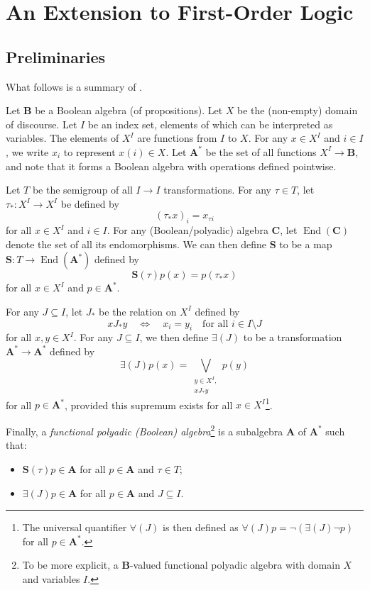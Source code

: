\documentclass{article}
\theoremstyle{definition}
\theoremstyle{remark}
\DeclareMathOperator{\End}{End}
\begin{document}
\section{An Extension to First-Order Logic}

\subsection{Preliminaries}

What follows is a summary of \cite{halmos2016algebraic}.

Let $\mathbf{B}$ be a Boolean algebra (of propositions). Let $X$ be the
(non-empty) domain of discourse. Let $I$ be an index set, elements of which can
be interpreted as variables. The elements of $X^I$ are functions from $I$ to
$X$. For any $x \in X^I$ and $i \in I$, we write $x_i$ to represent $x(i) \in
X$. Let $\mathbf{A^*}$ be the set of all functions $X^I \to \mathbf{B}$, and
note that it forms a Boolean algebra with operations defined pointwise.

Let $T$ be the semigroup of all $I \to I$ transformations. For any $\tau \in
T$, let $\tau_* : X^I \to X^I$ be defined by
\[
  (\tau_* x)_i = x_{\tau i}
\]
for all $x \in X^I$ and $i \in I$. For any (Boolean/polyadic) algebra
$\mathbf{C}$, let $\End(\mathbf{C})$ denote the set of all its endomorphisms. We
can then define $\mathbf{S}$ to be a map $\mathbf{S} : T \to \End(\mathbf{A^*})$
defined by
\[
  \mathbf{S}(\tau)p(x) = p(\tau_* x)
\]
for all $x \in X^I$ and $p \in \mathbf{A^*}$.

For any $J \subseteq I$, let $J_*$ be the relation on $X^I$ defined by
\[
  xJ_*y \quad \iff \quad x_i = y_i \quad \text{for all } i \in I \setminus J
\]
for all $x, y \in X^I$. For any $J \subseteq I$, we then define $\bm\exists(J)$
to be a transformation $\mathbf{A^*} \to \mathbf{A^*}$ defined by
\[
  \bm\exists(J)p(x) = \bigvee_{\substack{y \in X^I,\\ xJ_*y}} p(y)
\]
for all $p \in \mathbf{A^*}$, provided this supremum exists for all $x \in
X^I$\footnote{The universal quantifier $\bm\forall(J)$ is then defined as
  $\bm\forall(J)p = \neg(\bm\exists(J)\neg p)$ for all $p \in \mathbf{A^*}$.}.

Finally, a \emph{functional polyadic (Boolean) algebra}\footnote{To be more
  explicit, a $\mathbf{B}$-valued functional polyadic algebra with domain $X$
  and variables $I$.} is a subalgebra
$\mathbf{A}$ of $\mathbf{A^*}$ such that:
\begin{itemize}
\item $\mathbf{S}(\tau)p \in \mathbf{A}$ for all $p \in \mathbf{A}$ and $\tau
  \in T$;
\item $\bm\exists(J)p \in \mathbf{A}$ for all $p \in \mathbf{A}$ and $J
  \subseteq I$.
\end{itemize}
\end{document}
